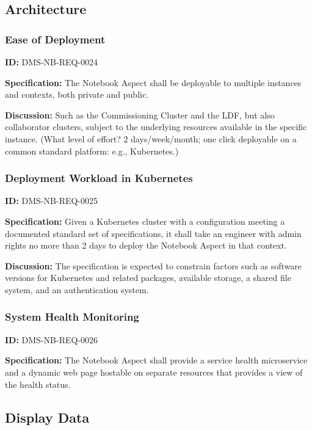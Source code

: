 \documentclass[SE,toc,lsstdraft]{lsstdoc}
\begin{document}
\subsection{Architecture}

\subsubsection{Ease of Deployment}

\label{DMS-NB-REQ-0024}
\textbf{ID:} DMS-NB-REQ-0024

\textbf{Specification:}
The Notebook Aspect shall be deployable to multiple instances and contexts, both private and public.

\textbf{Discussion:}
Such as the Commissioning Cluster and the LDF, but also collaborator clusters, subject to the underlying resources available in the specific instance. (What level of effort? 2 days/week/month; one click deployable on a common standard platform: e.g., Kubernetes.)

\subsubsection{Deployment Workload in Kubernetes}

\label{DMS-NB-REQ-0025}
\textbf{ID:} DMS-NB-REQ-0025

\textbf{Specification:}
Given a Kubernetes cluster with a configuration meeting a documented standard set of specifications, it shall take an engineer with admin rights no more than 2 days to deploy the Notebook Aspect in that context.

\textbf{Discussion:}
The specification is expected to constrain factors such as software versions for Kubernetes and related packages, available storage, a shared file system, and an authentication system.

\subsubsection{System Health Monitoring}

\label{DMS-NB-REQ-0026}
\textbf{ID:} DMS-NB-REQ-0026

\textbf{Specification:}
The Notebook Aspect shall provide a service health microservice and a dynamic web page hostable on separate resources that provides a view of the health status.

\subsection{Display Data}
\end{document}
